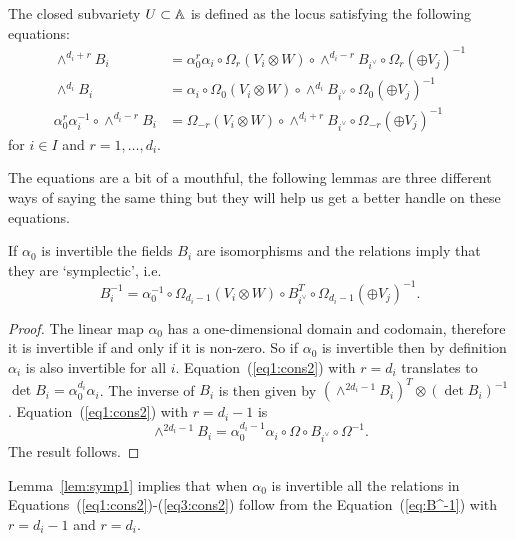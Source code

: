 \documentclass{amsart}
\theoremstyle{definition}
\begin{document}
\begin{definition}\label{def:equa}
The closed subvariety $U \subset \mathbb{A}$ is defined as the locus satisfying the following equations:
\begin{align}
    \wedge^{d_i+r} B_i &= \alpha_0^r \alpha_i \circ \Omega_r(V_i \otimes W) \circ \wedge^{d_i-r} B_{i^\vee} \circ \Omega_r(\oplus V_j)^{-1}  \label{eq1:cons2} \\
    \wedge^{d_i} B_i &= \alpha_i \circ \Omega_{0}(V_i \otimes W) \circ \wedge^{d_i} B_{i^\vee} \circ \Omega_{0}(\oplus V_j)^{-1} \label{eq2:cons2} \\
    \alpha_0^r \alpha_i^{-1} \circ \wedge^{d_i-r} B_i &= \Omega_{-r}(V_i \otimes W) \circ \wedge^{d_i+r} B_{i^\vee} \circ \Omega_{-r}(\oplus V_j)^{-1} \label{eq3:cons2} 
\end{align}
for $i\in I$ and $r=1,\ldots,d_i$.
\end{definition}

The equations are a bit of a mouthful, the following lemmas are three different ways of saying the same thing but they will help us get a better handle on these equations.

\begin{lemma}\label{lem:symp1}
If $\alpha_0$ is invertible the fields $B_i$ are isomorphisms and the relations imply that they are `symplectic', i.e.
\begin{equation}\label{eq:B^-1}
    B_i^{-1} = \alpha_0^{-1} \circ \Omega_{d_i-1}(V_i \otimes W) \circ B_{i^\vee}^T \circ \Omega_{d_i-1}(\oplus V_j)^{-1}.
\end{equation}
\end{lemma}

\begin{proof}
The linear map $\alpha_0$ has a one-dimensional domain and codomain, therefore it is invertible if and only if it is non-zero.
So if $\alpha_0$ is invertible then by definition $\alpha_i$ is also invertible for all $i$.
Equation~(\ref{eq1:cons2}) with $r=d_i$ translates to $\det B_i= \alpha_0^{d_i} \alpha_i$.
The inverse of $B_i$ is then given by $(\wedge^{2d_i-1}B_i)^T \otimes (\det B_i)^{-1}$.
Equation~(\ref{eq1:cons2}) with $r=d_i-1$ is $$\wedge^{2d_i-1} B_i = \alpha_0^{d_i-1} \alpha_i \circ \Omega \circ B_{i^\vee} \circ \Omega^{-1}.$$
The result follows.
\end{proof}

\begin{remark}
Lemma~\ref{lem:symp1} implies that when $\alpha_0$ is invertible all the relations in Equations~(\ref{eq1:cons2})-(\ref{eq3:cons2}) follow from the Equation~(\ref{eq:B^-1}) with $r=d_i-1$ and $r=d_i$.
\end{remark}
\end{document}
